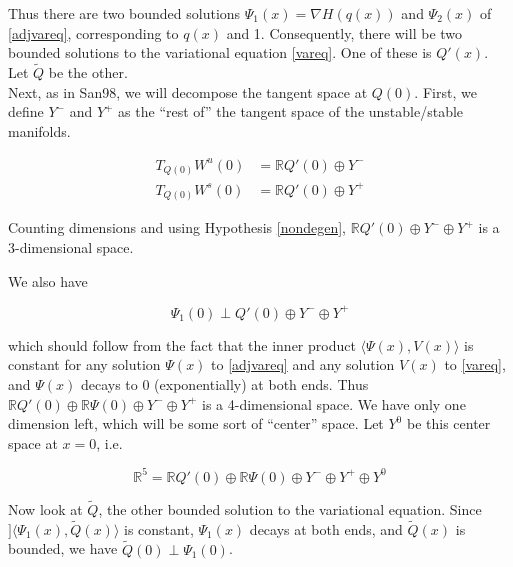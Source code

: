 \documentclass[12pt]{article}
\def\R{{\mathbb R}}
\begin{document}
Thus there are two bounded solutions $\Psi_1(x) = \nabla H(q(x))$ and $\Psi_2(x)$ of \eqref{adjvareq}, corresponding to $q(x)$ and 1. Consequently, there will be two bounded solutions to the variational equation \eqref{vareq}. One of these is $Q'(x)$. Let $\tilde{Q}$ be the other.
\\

Next, as in San98, we will decompose the tangent space at $Q(0)$. First, we define $Y^-$ and $Y^+$ as the ``rest of'' the tangent space of the unstable/stable manifolds.

\begin{align*}
T_{Q(0)} W^u(0) &= \R Q'(0) \oplus Y^- \\
T_{Q(0)} W^s(0) &= \R Q'(0) \oplus Y^+
\end{align*}

Counting dimensions and using Hypothesis \ref{nondegen}, $\R Q'(0) \oplus Y^- \oplus Y^+$ is a 3-dimensional space. 

We also have

\[
\Psi_1(0) \perp Q'(0) \oplus Y^- \oplus Y^+
\]

which should follow from the fact that the inner product $\langle \Psi(x), V(x) \rangle$ is constant for any solution $\Psi(x)$ to \ref{adjvareq} and any solution $V(x)$ to \ref{vareq}, and $\Psi(x)$ decays to 0 (exponentially) at both ends. Thus $\R Q'(0) \oplus \R \Psi(0) \oplus Y^- \oplus Y^+$ is a 4-dimensional space. We have only one dimension left, which will be some sort of ``center'' space. Let $Y^0$ be this center space at $x = 0$, i.e.  

\[
\R^5 = \R Q'(0) \oplus \R \Psi(0) \oplus Y^- \oplus Y^+ \oplus Y^0
\]

Now look at $\tilde{Q}$, the other bounded solution to the variational equation. Since $]\langle \Psi_1(x), \tilde{Q}(x) \rangle$ is constant, $\Psi_1(x)$ decays at both ends, and $\tilde{Q}(x)$ is bounded, we have $\tilde{Q}(0) \perp \Psi_1(0)$. \\
\end{document}
